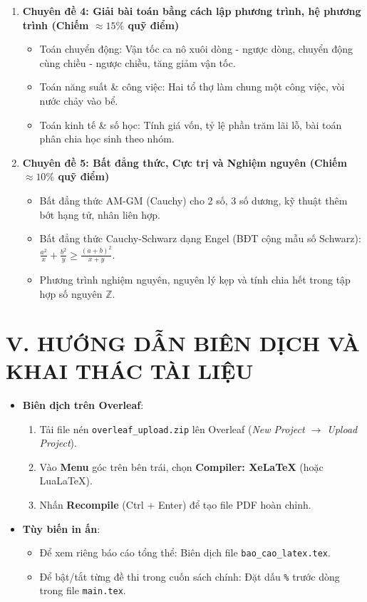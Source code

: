 \begin{enumerate}[label=\textbf{\arabic*.}]
  \item \textbf{Chuyên đề 4: Giải bài toán bằng cách lập phương trình, hệ phương trình (Chiếm $\approx 15\%$ quỹ điểm)}
  \begin{itemize}
    \item Toán chuyển động: Vận tốc ca nô xuôi dòng - ngược dòng, chuyển động cùng chiều - ngược chiều, tăng giảm vận tốc.
    \item Toán năng suất \& công việc: Hai tổ thợ làm chung một công việc, vòi nước chảy vào bể.
    \item Toán kinh tế \& số học: Tính giá vốn, tỷ lệ phần trăm lãi lỗ, bài toán phân chia học sinh theo nhóm.
  \end{itemize}

  \item \textbf{Chuyên đề 5: Bất đẳng thức, Cực trị và Nghiệm nguyên (Chiếm $\approx 10\%$ quỹ điểm)}
  \begin{itemize}
    \item Bất đẳng thức AM-GM (Cauchy) cho 2 số, 3 số dương, kỹ thuật thêm bớt hạng tử, nhân liên hợp.
    \item Bất đẳng thức Cauchy-Schwarz dạng Engel (BĐT cộng mẫu số Schwarz): $\frac{a^2}{x} + \frac{b^2}{y} \ge \frac{(a+b)^2}{x+y}$.
    \item Phương trình nghiệm nguyên, nguyên lý kẹp và tính chia hết trong tập hợp số nguyên $\mathbb{Z}$.
  \end{itemize}
\end{enumerate}

\section*{V. HƯỚNG DẪN BIÊN DỊCH VÀ KHAI THÁC TÀI LIỆU}

\begin{tcolorbox}[colback=LightGreenShade,colframe=AccentGreen,arc=4pt,boxrule=0.8pt,title={\bfseries Hướng dẫn biên dịch nhanh}]
\begin{itemize}
  \item \textbf{Biên dịch trên Overleaf}:
  \begin{enumerate}
    \item Tải file nén \texttt{overleaf\_upload.zip} lên Overleaf (\textit{New Project $\to$ Upload Project}).
    \item Vào \textbf{Menu} góc trên bên trái, chọn \textbf{Compiler: XeLaTeX} (hoặc LuaLaTeX).
    \item Nhấn \textbf{Recompile} (Ctrl + Enter) để tạo file PDF hoàn chỉnh.
  \end{enumerate}
  \item \textbf{Tùy biến in ấn}:
  \begin{itemize}
    \item Để xem riêng báo cáo tổng thể: Biên dịch file \texttt{bao\_cao\_latex.tex}.
    \item Để bật/tắt từng đề thi trong cuốn sách chính: Đặt dấu \texttt{\%} trước dòng \verb|| trong file \texttt{main.tex}.
  \end{itemize}
\end{itemize}
\end{tcolorbox}

